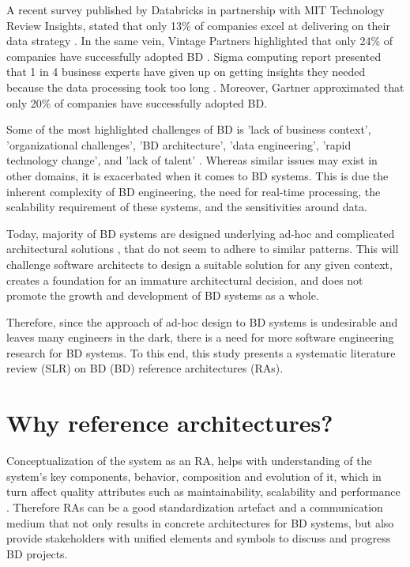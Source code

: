 \documentclass[review]{elsarticle}
\begin{document}
A recent survey published by Databricks in partnership with MIT Technology Review Insights, stated that only 13\% of companies excel at delivering on their data strategy \cite{DataBricks}. In the same vein, Vintage Partners highlighted that only 24\% of companies have successfully adopted BD \cite{NewVantageSurvey}. Sigma computing report presented that 1 in 4 business experts have given up on getting insights they needed because the data processing took too long \cite{SigmaSurvey}. Moreover, Gartner approximated that only 20\% of companies have successfully adopted BD. 

Some of the most highlighted challenges of BD is 'lack of business context', 'organizational challenges', 'BD architecture', 'data engineering', 'rapid technology change', and 'lack of talent' \cite{AtaeiBigDataEnvirons}. Whereas similar issues may exist in other domains, it is exacerbated when it comes to BD systems. This is due the inherent complexity of BD engineering, the need for real-time processing, the scalability requirement of these systems, and the sensitivities around data.

Today, majority of BD systems are designed underlying ad-hoc and complicated architectural solutions \cite{Gorton}, that do not seem to adhere to similar patterns. This will challenge software architects to design a suitable solution for any given context, creates a foundation for an immature architectural decision, and does not promote the growth and development of BD systems as a whole. 

Therefore, since the approach of ad-hoc design to BD systems is undesirable and leaves many engineers in the dark, there is a need for more software engineering research for BD systems. To this end, this study presents a systematic literature review (SLR) on BD (BD) reference architectures (RAs). 

\section{Why reference architectures?}
Conceptualization of the system as an RA, helps with understanding of the system’s key components, behavior, composition and evolution of it, which in turn affect quality attributes such as maintainability, scalability and performance \cite{Cloutier}. Therefore RAs can be a good standardization artefact and a communication medium that not only results in concrete architectures for BD systems, but also provide stakeholders with unified elements and symbols to discuss and progress BD projects.
\end{document}
